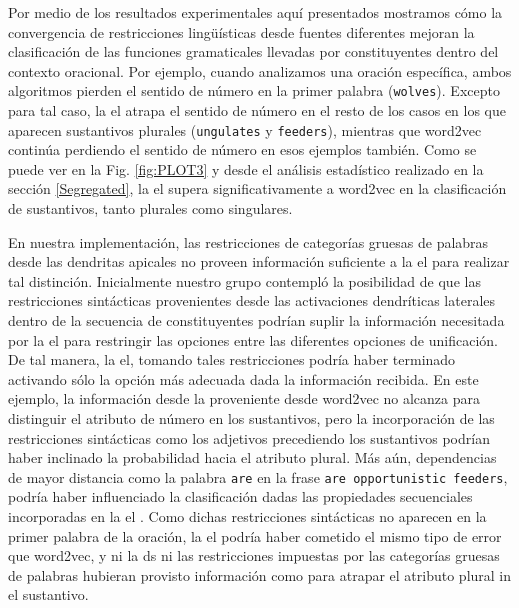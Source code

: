 Por medio de los resultados experimentales aquí presentados mostramos cómo la convergencia de restricciones lingüísticas desde fuentes diferentes mejoran la clasificación de las funciones gramaticales llevadas por constituyentes dentro del contexto oracional.
Por ejemplo, cuando analizamos una oración específica, ambos algoritmos pierden el sentido de número en la primer palabra (\texttt{wolves}).
Excepto para tal caso, la \gls{el} atrapa el sentido de número en el resto de los casos en los que aparecen sustantivos plurales (\texttt{ungulates} y \texttt{feeders}), mientras que word2vec continúa perdiendo el sentido de número en esos ejemplos también.
Como se puede ver en la Fig. \ref{fig:PLOT3} y desde el análisis estadístico realizado en la sección \ref{Segregated}, la \gls{el} supera significativamente a word2vec en la clasificación de sustantivos, tanto plurales como singulares.

En nuestra implementación, las restricciones de categorías gruesas de palabras desde las dendritas apicales no proveen información suficiente a la \gls{el} para realizar tal distinción.
Inicialmente nuestro grupo contempló la posibilidad de que las restricciones sintácticas provenientes desde las activaciones dendríticas laterales dentro de la secuencia de constituyentes podrían suplir la información necesitada por la \gls{el} para restringir las opciones entre las diferentes opciones de unificación.
De tal manera, la \gls{el}, tomando tales restricciones podría haber terminado activando sólo la opción más adecuada dada la información recibida.
En este ejemplo, la información desde la  proveniente desde word2vec no alcanza para distinguir el atributo de número en los sustantivos, pero la incorporación de las restricciones sintácticas como los adjetivos precediendo los sustantivos podrían haber inclinado la probabilidad hacia el atributo plural.
Más aún, dependencias de mayor distancia como la palabra \texttt{are} en la frase \texttt{are opportunistic feeders}, podría haber influenciado la clasificación dadas las propiedades secuenciales incorporadas en la \gls{el} \cite{Cui:2016:COS:3030654.3030660}.
Como dichas restricciones sintácticas no aparecen en la primer palabra de la oración, la \gls{el}  podría haber cometido el mismo tipo de error que word2vec, y ni la \gls{ds} ni las restricciones impuestas por las categorías gruesas de palabras hubieran provisto información como para atrapar el atributo plural in el sustantivo.

